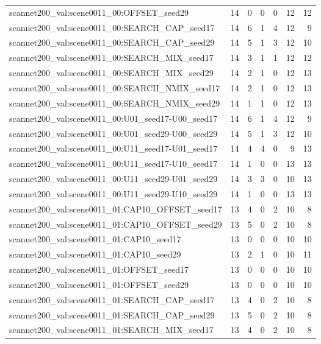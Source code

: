 \begin{table}[t]
\begin{tabular}{lrrrrrr}
scannet200\_val:scene0011\_00:OFFSET\_seed29 & 14 & 0 & 0 & 0 & 12 & 12 \\
scannet200\_val:scene0011\_00:SEARCH\_CAP\_seed17 & 14 & 6 & 1 & 4 & 12 & 9 \\
scannet200\_val:scene0011\_00:SEARCH\_CAP\_seed29 & 14 & 5 & 1 & 3 & 12 & 10 \\
scannet200\_val:scene0011\_00:SEARCH\_MIX\_seed17 & 14 & 3 & 1 & 1 & 12 & 12 \\
scannet200\_val:scene0011\_00:SEARCH\_MIX\_seed29 & 14 & 2 & 1 & 0 & 12 & 13 \\
scannet200\_val:scene0011\_00:SEARCH\_NMIX\_seed17 & 14 & 2 & 1 & 0 & 12 & 13 \\
scannet200\_val:scene0011\_00:SEARCH\_NMIX\_seed29 & 14 & 1 & 1 & 0 & 12 & 13 \\
scannet200\_val:scene0011\_00:U01\_seed17-U00\_seed17 & 14 & 6 & 1 & 4 & 12 & 9 \\
scannet200\_val:scene0011\_00:U01\_seed29-U00\_seed29 & 14 & 5 & 1 & 3 & 12 & 10 \\
scannet200\_val:scene0011\_00:U11\_seed17-U01\_seed17 & 14 & 4 & 4 & 0 & 9 & 13 \\
scannet200\_val:scene0011\_00:U11\_seed17-U10\_seed17 & 14 & 1 & 0 & 0 & 13 & 13 \\
scannet200\_val:scene0011\_00:U11\_seed29-U01\_seed29 & 14 & 3 & 3 & 0 & 10 & 13 \\
scannet200\_val:scene0011\_00:U11\_seed29-U10\_seed29 & 14 & 1 & 0 & 0 & 13 & 13 \\
scannet200\_val:scene0011\_01:CAP10\_OFFSET\_seed17 & 13 & 4 & 0 & 2 & 10 & 8 \\
scannet200\_val:scene0011\_01:CAP10\_OFFSET\_seed29 & 13 & 5 & 0 & 2 & 10 & 8 \\
scannet200\_val:scene0011\_01:CAP10\_seed17 & 13 & 0 & 0 & 0 & 10 & 10 \\
scannet200\_val:scene0011\_01:CAP10\_seed29 & 13 & 2 & 1 & 0 & 10 & 11 \\
scannet200\_val:scene0011\_01:OFFSET\_seed17 & 13 & 0 & 0 & 0 & 10 & 10 \\
scannet200\_val:scene0011\_01:OFFSET\_seed29 & 13 & 0 & 0 & 0 & 10 & 10 \\
scannet200\_val:scene0011\_01:SEARCH\_CAP\_seed17 & 13 & 4 & 0 & 2 & 10 & 8 \\
scannet200\_val:scene0011\_01:SEARCH\_CAP\_seed29 & 13 & 5 & 0 & 2 & 10 & 8 \\
scannet200\_val:scene0011\_01:SEARCH\_MIX\_seed17 & 13 & 4 & 0 & 2 & 10 & 8 \\

\end{tabular}
\end{table}
